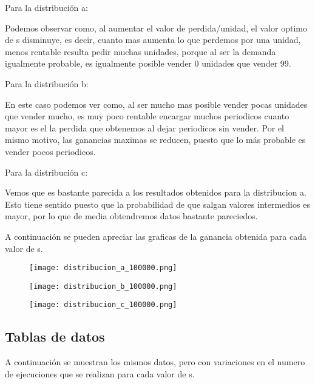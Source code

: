 Para la distribución a:

Podemos observar como, al aumentar el valor de perdida/unidad, el valor optimo de s disminuye, es decir, cuanto mas aumenta lo que perdemos por una unidad, menos rentable resulta pedir muchas unidades, porque al ser la demanda igualmente probable, es igualmente posible vender 0 unidades que vender 99.

Para la distribución b:

En este caso podemos ver como, al ser mucho mas posible vender pocas unidades que vender mucho, es muy poco rentable encargar muchos periodicos cuanto mayor es el la perdida que obtenemos al dejar periodicos sin vender.
Por el mismo motivo, las ganancias maximas se reducen, puesto que lo más probable es vender pocos periodicos.

Para la distribución c:

Vemos que es bastante parecida a los resultados obtenidos para la distribucion a. Esto tiene sentido puesto que la probabilidad de que salgan valores intermedios es mayor, por lo que de media obtendremos datos bastante pareciedos.

\newpage

A continuación se pueden apreciar las graficas de la ganancia obtenida para cada valor de s.


\begin{figure}[H]
	\centering
	\texttt{[image: distribucion\_a\_100000.png]}
\end{figure}
\begin{figure}[H]
	\centering
	\texttt{[image: distribucion\_b\_100000.png]}
\end{figure}
\begin{figure}[H]
	\centering
	\texttt{[image: distribucion\_c\_100000.png]}
\end{figure}



\subsection{Tablas de datos}
A continuación se muestran los mismos datos, pero con variaciones en el numero de ejecuciones que se realizan para cada valor de s.


